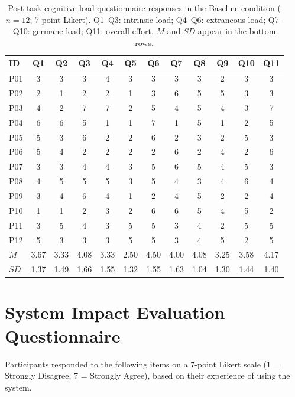 \documentclass[manuscript,review,anonymous]{acmart}
\begin{document}
\begin{table}[t]
\centering
\caption{Post-task cognitive load questionnaire responses in the Baseline condition ($n=12$; 7-point Likert). Q1--Q3: intrinsic load; Q4--Q6: extraneous load; Q7--Q10: germane load; Q11: overall effort. $M$ and $SD$ appear in the bottom rows.}
\label{tab:clt_baseline}
\small
\setlength{\tabcolsep}{4pt}
\begin{tabular}{lccccccccccc}
\toprule
\textbf{ID} & \textbf{Q1} & \textbf{Q2} & \textbf{Q3} & \textbf{Q4} & \textbf{Q5} & \textbf{Q6} & \textbf{Q7} & \textbf{Q8} & \textbf{Q9} & \textbf{Q10} & \textbf{Q11} \\
\midrule
P01 & 3 & 3 & 3 & 4 & 3 & 3 & 3 & 3 & 2 & 3 & 3 \\
P02 & 2 & 1 & 2 & 2 & 1 & 3 & 6 & 5 & 5 & 3 & 3 \\
P03 & 4 & 2 & 7 & 7 & 2 & 5 & 4 & 5 & 4 & 3 & 7 \\
P04 & 6 & 6 & 5 & 1 & 1 & 7 & 1 & 5 & 1 & 2 & 5 \\
P05 & 5 & 3 & 6 & 2 & 2 & 6 & 2 & 3 & 2 & 5 & 3 \\
P06 & 5 & 4 & 2 & 2 & 2 & 2 & 6 & 2 & 4 & 2 & 6 \\
P07 & 3 & 3 & 4 & 4 & 3 & 5 & 6 & 5 & 4 & 5 & 3 \\
P08 & 4 & 5 & 5 & 5 & 3 & 5 & 4 & 3 & 4 & 6 & 4 \\
P09 & 3 & 4 & 6 & 4 & 1 & 2 & 4 & 5 & 2 & 2 & 4 \\
P10 & 1 & 1 & 2 & 3 & 2 & 6 & 6 & 5 & 4 & 5 & 2 \\
P11 & 3 & 5 & 4 & 3 & 5 & 5 & 3 & 4 & 2 & 5 & 5 \\
P12 & 5 & 3 & 3 & 3 & 5 & 5 & 3 & 4 & 5 & 2 & 5 \\
\midrule
$M$ & 3.67 & 3.33 & 4.08 & 3.33 & 2.50 & 4.50 & 4.00 & 4.08 & 3.25 & 3.58 & 4.17 \\
$SD$ & 1.37 & 1.49 & 1.66 & 1.55 & 1.32 & 1.55 & 1.63 & 1.04 & 1.30 & 1.44 & 1.40 \\
\bottomrule
\end{tabular}
\end{table}


\section{System Impact Evaluation Questionnaire}

Participants responded to the following items on a 7-point Likert scale 
(1 = Strongly Disagree, 7 = Strongly Agree), based on their experience of using the system.
\end{document}
